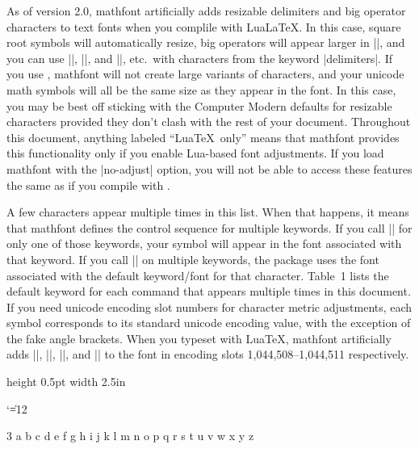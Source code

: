 \documentclass[12pt,twoside]{article}
\begin{document}
As of version 2.0, \textsf{mathfont} artificially adds resizable delimiters and big operator characters to text fonts when you complile with Lua\LaTeX. In this case, square root symbols will automatically resize, big operators will appear larger in |\displaystyle|, and you can use |\left|, |\right|, and |\big|, etc.\ with characters from the keyword |delimiters|. If you use \XeTeX, \textsf{mathfont} will not create large variants of characters, and your unicode math symbols will all be the same size as they appear in the font. In this case, you may be best off sticking with the Computer Modern defaults for resizable characters provided they don't clash with the rest of your document. Throughout this document, anything labeled ``Lua\TeX\ only'' means that \textsf{mathfont} provides this functionality only if you enable Lua-based font adjustments. If you load \textsf{mathfont} with the |no-adjust| option, you will not be able to access these features the same as if you compile with \XeTeX.

A few characters appear multiple times in this list. When that happens, it means that \textsf{mathfont} defines the control sequence for multiple keywords. If you call |\mathfont| for only one of those keywords, your symbol will appear in the font associated with that keyword. If you call |\mathfont| on multiple keywords, the package uses the font associated with the default keyword/font for that character. Table~1 lists the default keyword for each command that appears multiple times in this document. If you need unicode encoding slot numbers for character metric adjustments, each symbol corresponds to its standard unicode encoding value, with the exception of the fake angle brackets. When you typeset with Lua\TeX, \textsf{mathfont} artificially adds |\fakelangle|, |\fakerangle|, |\fakellangle|, and |\fakerrangle| to the font in encoding slots 1,044,508--1,044,511 respectively.

\bigskip\centerline{\vrule height 0.5pt width 2.5in}\medskip\smallskip

\catcode`\|=12


\begin{multicols}{3}
\charexample a
\charexample b
\charexample c
\charexample d
\charexample e
\charexample f
\charexample g
\charexample h
\charexample i
\charexample j
\charexample k
\charexample l
\charexample m
\charexample n
\charexample o
\charexample p
\charexample q
\charexample r
\charexample s
\charexample t
\charexample u
\charexample v
\charexample w
\charexample x
\charexample y
\charexample z
\charexample\hbar
\charexample\imath
\charexample\jmath
\end{multicols}
\end{document}
